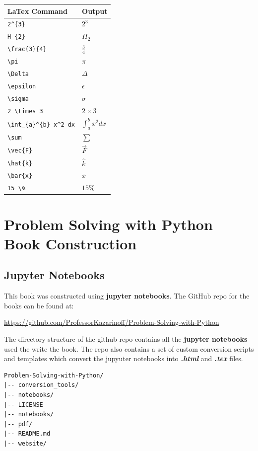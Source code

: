 \documentclass{book}
\begin{document}
\begin{longtable}[]{@{}ll@{}}
\toprule
LaTex Command & Output\tabularnewline
\midrule
\endhead
\lstinline!2^{3}! & \(2^{3}\)\tabularnewline
\lstinline!H_{2}! & \(H_{2}\)\tabularnewline
\lstinline!\frac{3}{4}! & \(\frac{3}{4}\)\tabularnewline
\lstinline!\pi! & \(\pi\)\tabularnewline
\lstinline!\Delta! & \(\Delta\)\tabularnewline
\lstinline!\epsilon! & \(\epsilon\)\tabularnewline
\lstinline!\sigma! & \(\sigma\)\tabularnewline
\lstinline!2 \times 3! & \(2 \times 3\)\tabularnewline
\lstinline!\int_{a}^{b} x^2 dx! & \(\int_{a}^{b} x^2 dx\)\tabularnewline
\lstinline!\sum! & \(\sum\)\tabularnewline
\lstinline!\vec{F}! & \(\vec{F}\)\tabularnewline
\lstinline!\hat{k}! & \(\hat{k}\)\tabularnewline
\lstinline!\bar{x}! & \(\bar{x}\)\tabularnewline
\lstinline!15 \%! & \(15 \%\)\tabularnewline
\bottomrule
\end{longtable}
    




    
        \section{Problem Solving with Python Book
Construction}\label{problem-solving-with-python-book-construction}
    




    
        \subsection{Jupyter Notebooks}\label{jupyter-notebooks}
    




    
        This book was constructed using \textbf{jupyter notebooks}. The GitHub
repo for the books can be found at:

\url{https://github.com/ProfessorKazarinoff/Problem-Solving-with-Python}
    




    
        The directory structure of the github repo contains all the
\textbf{jupyter notebooks} used the write the book. The repo also
contains a set of custom conversion scripts and templates which convert
the jupyuter notebooks into \textbf{\emph{.html}} and
\textbf{\emph{.tex}} files.
    




    
        \begin{lstlisting}
Problem-Solving-with-Python/
|-- conversion_tools/
|-- notebooks/
|-- LICENSE
|-- notebooks/
|-- pdf/
|-- README.md
|-- website/
\end{lstlisting}
    
\end{document}
